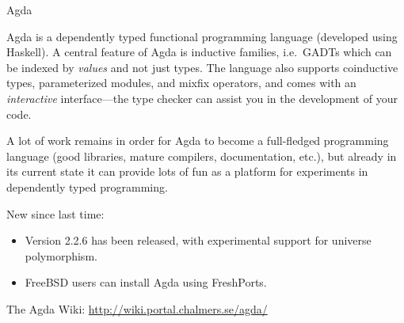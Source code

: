 \documentclass{article}
\begin{document}
\begin{hcarentry}[updated]{Agda}
\label{agda}
\makeheader

Agda is a dependently typed functional programming language (developed
using Haskell). A central feature of Agda is inductive families, i.e.\
GADTs which can be indexed by \emph{values} and not just types. The
language also supports coinductive types, parameterized modules, and
mixfix operators, and comes with an \emph{interactive} interface---the
type checker can assist you in the development of your code.

A lot of work remains in order for Agda to become a full-fledged
programming language (good libraries, mature compilers, documentation,
etc.), but already in its current state it can provide lots of fun as
a platform for experiments in dependently typed programming.

New since last time:
\begin{itemize}
\item Version 2.2.6 has been released, with experimental support for
  universe polymorphism.
\item FreeBSD users can install Agda using FreshPorts.
\end{itemize}

\FurtherReading
  The Agda Wiki: \url{http://wiki.portal.chalmers.se/agda/}
\end{hcarentry}
\end{document}
